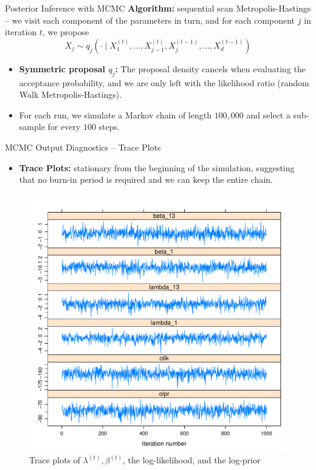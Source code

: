 \begin{frame}{Posterior Inference with MCMC}
\textbf{Algorithm:} sequential scan Metropolis-Hastings -- we visit each component of the parameters in turn, and for each component $j$ in iteration $t$, we propose
$$
X_{j} \sim q_{j}(\cdot \mid X_{1}^{(t)}, \ldots, X_{j-1}^{(t)}, X_{j}^{(t-1)}, \ldots, X_{d}^{(t-1)})
$$

\begin{itemize}
\vspace{0.2cm}
\item \textbf{Symmetric proposal $q_{j}$:} The proposal density cancels when evaluating the acceptance probability, and we are only left with the likelihood ratio (random Walk Metropolis-Hastings).
\vspace{0.2cm}
\item For each run, we simulate a Markov chain of length $100,000$ and select a sub-sample for every $100$ steps.
\vspace{0.2cm}
\end{itemize}
\end{frame}

\begin{frame}{MCMC Output Diagnostics -- Trace Plots}
\vspace{0.2cm}
\begin{itemize}
\item \textbf{Trace Plots:} stationary from the beginning of the simulation, suggesting that no burn-in period is required and we can keep the entire chain.
\end{itemize}

\begin{figure}
\centering
\includegraphics[width=.45\linewidth]{img/xyplot.pdf}
\caption{Trace plots of $\lambda^{(t)}, \beta^{(t)}$, the log-likelihood, and the log-prior}
\label{fig:xyplot}
\end{figure}
\end{frame}


